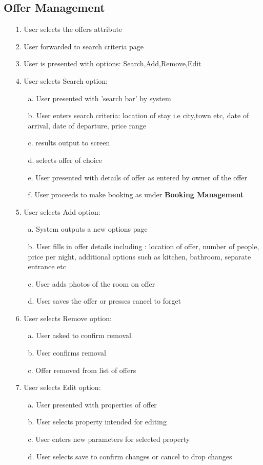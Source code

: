 \subsection {Offer Management}
\begin{itemize}
\item[1.] User selects the offers attribute 
\item[2.] User forwarded to search criteria page 
\item[3.] User is presented with options: Search,Add,Remove,Edit
\item[4.] User selects Search option:
	\begin{itemize}
		\item[a.] User presented with 'search bar' by system
		\item[b.] User enters search criteria: location of stay i.e city,town etc, date of arrival, date of departure, price range
		\item[c.] results output to screen
		\item[d.] selects offer of choice
		\item[e.] User presented with details of offer as entered by owner of the offer
		\item[f.] User proceeds to make booking as under \textbf{Booking Management}
	\end{itemize}
\item[5.]User selects Add option:
	\begin{itemize}
		\item[a.] System outputs a new options page
		\item[b.] User fills in offer details including : location of offer, number of people, price per night, additional options such as kitchen, bathroom, separate entrance etc
		\item[c.] User adds photos of the room on offer
		\item[d.] User saves the offer or presses cancel to forget
	\end{itemize}
\item[6.] User selects Remove option:
	\begin{itemize}
		\item[a.] User asked to confirm removal
		\item[b.] User confirms removal
		\item[c.] Offer removed from list of offers
	\end{itemize}
\item[7.] User selects Edit option:
	\begin{itemize}
		\item[a.] User presented with properties of offer
		\item[b.] User selects property intended for editing
		\item[c.] User enters new parameters for selected property
		\item[d.] User selects save to confirm changes or cancel to drop changes
	\end{itemize}
\end{itemize}
